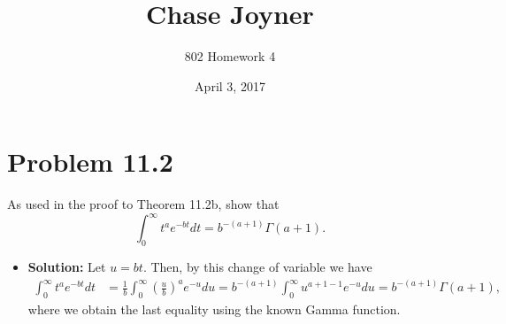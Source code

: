 \documentclass[11pt]{article}
\title{Chase Joyner}
\author{802 Homework 4}
\date{April 3, 2017}
\begin{document}
\maketitle

\section*{Problem 11.2}
As used in the proof to Theorem 11.2b, show that
\[
\int_0^\infty t^ae^{-bt}dt = b^{-(a+1)}\Gamma(a+1).
\]
\begin{itemize}
\item[] \textbf{Solution:}  Let $u = bt$.  Then, by this change of variable we have
\begin{align*}
\int_0^\infty t^ae^{-bt}dt &= \frac{1}{b}\int_0^\infty \left(\frac{u}{b}\right)^ae^{-u}du = b^{-(a+1)}\int_0^\infty u^{a+1-1}e^{-u}du = b^{-(a+1)}\Gamma(a+1),
\end{align*}
where we obtain the last equality using the known Gamma function.
\end{itemize}
\end{document}
